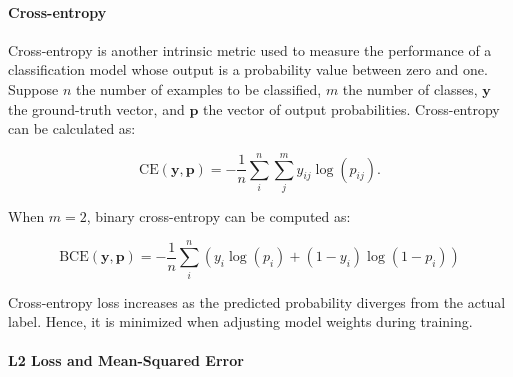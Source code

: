 

\paragraph{Cross-entropy}



Cross-entropy is another intrinsic metric used to measure the performance of a classification model whose output is a probability value between zero and one. Suppose $n$ the number of examples to be classified, $m$ the number of classes, $\bm{y}$ the ground-truth vector, and $\bm{p}$ the vector of output probabilities. Cross-entropy can be calculated as:

\begin{equation}
    \text{CE}(\bm{y}, \bm{p}) = - \dfrac{1}{n} \sum_{i}^n \sum_{j}^m y_{ij} \log (p_{ij}).
\end{equation}

When $m = 2$, binary cross-entropy can be computed as:

\begin{equation}
    \text{BCE}(\bm{y}, \bm{p}) = - \dfrac{1}{n} \sum_{i}^n (y_i \log(p_i) + (1-y_i) \log (1-p_i))
\end{equation}

Cross-entropy loss increases as the predicted probability diverges from the actual label. Hence, it is minimized when adjusting model weights during training. 

\paragraph{L2 Loss and Mean-Squared Error}

